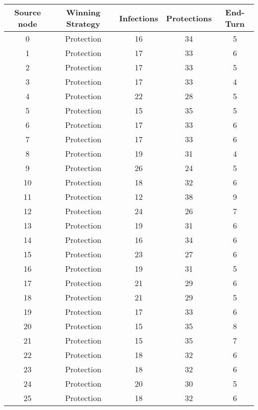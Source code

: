 \documentclass[results.tex]{subfiles}
\begin{document}
\begin{center}
  \begin{tabular}{| c || c | c | c | c |}
    \hline
    {\bfseries Source node} & {\bfseries Winning Strategy} & {\bfseries Infections} & {\bfseries Protections} & {\bfseries End-Turn} \\  %
    \hline\hline
    0 & Protection & 16 & 34 & 5 \\ 
    \hline
    1 & Protection & 17 & 33 & 6 \\ 
    \hline
    2 & Protection & 17 & 33 & 5 \\ 
    \hline
    3 & Protection & 17 & 33 & 4 \\ 
    \hline
    4 & Protection & 22 & 28 & 5 \\ 
    \hline
    5 & Protection & 15 & 35 & 5 \\ 
    \hline
    6 & Protection & 17 & 33 & 6 \\ 
    \hline
    7 & Protection & 17 & 33 & 6 \\ 
    \hline
    8 & Protection & 19 & 31 & 4 \\ 
    \hline
    9 & Protection & 26 & 24 & 5 \\ 
    \hline
    10 & Protection & 18 & 32 & 6 \\ 
    \hline
    11 & Protection & 12 & 38 & 9 \\ 
    \hline
    12 & Protection & 24 & 26 & 7 \\ 
    \hline
    13 & Protection & 19 & 31 & 6 \\ 
    \hline
    14 & Protection & 16 & 34 & 6 \\ 
    \hline
    15 & Protection & 23 & 27 & 6 \\ 
    \hline
    16 & Protection & 19 & 31 & 5 \\ 
    \hline
    17 & Protection & 21 & 29 & 6 \\ 
    \hline
    18 & Protection & 21 & 29 & 5 \\ 
    \hline
    19 & Protection & 17 & 33 & 6 \\ 
    \hline
    20 & Protection & 15 & 35 & 8 \\ 
    \hline
    21 & Protection & 15 & 35 & 7 \\ 
    \hline
    22 & Protection & 18 & 32 & 6 \\ 
    \hline
    23 & Protection & 18 & 32 & 6 \\ 
    \hline
    24 & Protection & 20 & 30 & 5 \\ 
    \hline
    25 & Protection & 18 & 32 & 6 \\ 

\end{tabular}
\end{center}
\end{document}
